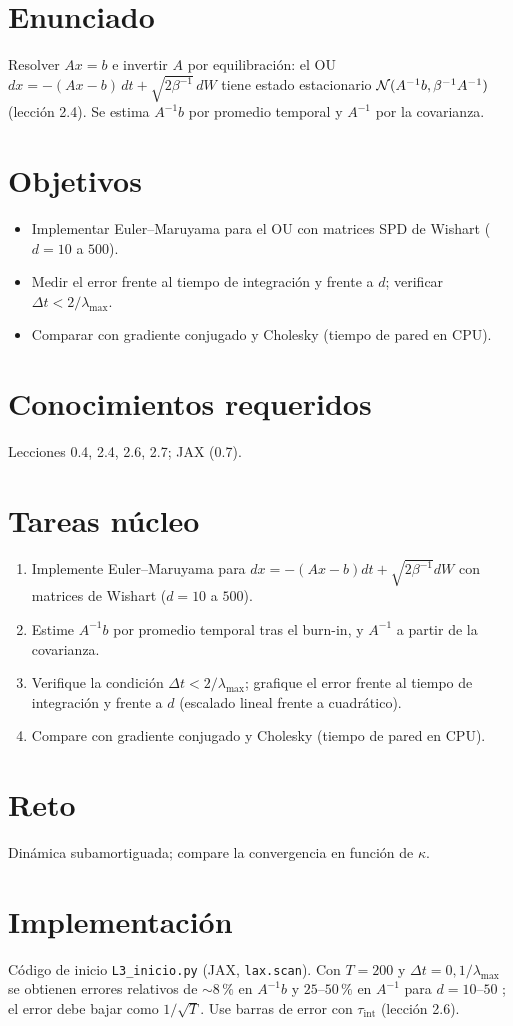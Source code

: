 \documentclass[11pt,a4paper]{article}
\begin{document}
\section*{Enunciado}
Resolver $Ax=b$ e invertir $A$ por equilibración: el OU $dx=-(Ax-b)\,dt+\sqrt{2\beta^{-1}}\,dW$ tiene estado estacionario
$\mathcal{N}(A^{-1}b,\beta^{-1}A^{-1})$ (lección 2.4). Se estima $A^{-1}b$ por promedio temporal y $A^{-1}$ por la covarianza.
\section*{Objetivos}
\begin{itemize}[nosep]
\item Implementar Euler--Maruyama para el OU con matrices SPD de Wishart ($d=10$ a $500$).
\item Medir el error frente al tiempo de integración y frente a $d$; verificar $\Delta t<2/\lambda_{\max}$.
\item Comparar con gradiente conjugado y Cholesky (tiempo de pared en CPU).
\end{itemize}
\section*{Conocimientos requeridos}
Lecciones 0.4, 2.4, 2.6, 2.7; JAX (0.7).
\section*{Tareas núcleo}
\begin{enumerate}
\item Implemente Euler--Maruyama para $dx=-(Ax-b)dt+\sqrt{2\beta^{-1}}dW$ con matrices de Wishart ($d=10$ a $500$).
\item Estime $A^{-1}b$ por promedio temporal tras el burn-in, y $A^{-1}$ a partir de la covarianza.
\item Verifique la condición $\Delta t<2/\lambda_{\max}$; grafique el error frente al tiempo de integración y frente a $d$ (escalado lineal frente a cuadrático).
\item Compare con gradiente conjugado y Cholesky (tiempo de pared en CPU).
\end{enumerate}
\section*{Reto}
Dinámica subamortiguada; compare la convergencia en función de $\kappa$.
\section*{Implementación}
Código de inicio \texttt{L3\_inicio.py} (JAX, \texttt{lax.scan}). Con $T=200$ y $\Delta t=0{,}1/\lambda_{\max}$ se obtienen errores relativos
de $\sim8\,\%$ en $A^{-1}b$ y $25$--$50\,\%$ en $A^{-1}$ para $d=10$--$50$ \evS; el error debe bajar como $1/\sqrt T$.
Use barras de error con $\tau_{\text{int}}$ (lección 2.6).
\end{document}
